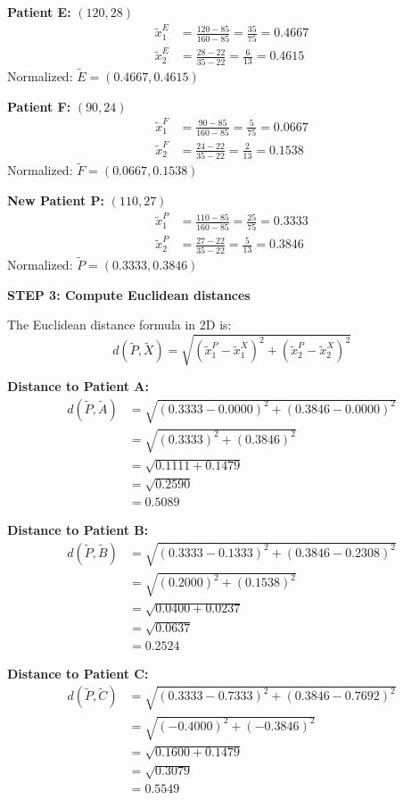 \documentclass[12pt]{article}
\begin{document}
\begin{solution}
\textbf{Patient E:} \((120, 28)\)
\begin{align*}
\tilde{x}_1^E &= \frac{120 - 85}{160 - 85} = \frac{35}{75} = 0.4667 \\
\tilde{x}_2^E &= \frac{28 - 22}{35 - 22} = \frac{6}{13} = 0.4615
\end{align*}
Normalized: \(\tilde{E} = (0.4667, 0.4615)\)

\textbf{Patient F:} \((90, 24)\)
\begin{align*}
\tilde{x}_1^F &= \frac{90 - 85}{160 - 85} = \frac{5}{75} = 0.0667 \\
\tilde{x}_2^F &= \frac{24 - 22}{35 - 22} = \frac{2}{13} = 0.1538
\end{align*}
Normalized: \(\tilde{F} = (0.0667, 0.1538)\)

\textbf{New Patient P:} \((110, 27)\)
\begin{align*}
\tilde{x}_1^P &= \frac{110 - 85}{160 - 85} = \frac{25}{75} = 0.3333 \\
\tilde{x}_2^P &= \frac{27 - 22}{35 - 22} = \frac{5}{13} = 0.3846
\end{align*}
Normalized: \(\tilde{P} = (0.3333, 0.3846)\)

\textbf{STEP 3: Compute Euclidean distances}

The Euclidean distance formula in 2D is:
\[
d(\tilde{P}, \tilde{X}) = \sqrt{(\tilde{x}_1^P - \tilde{x}_1^X)^2 + (\tilde{x}_2^P - \tilde{x}_2^X)^2}
\]

\textbf{Distance to Patient A:}
\begin{align*}
d(\tilde{P}, \tilde{A}) &= \sqrt{(0.3333 - 0.0000)^2 + (0.3846 - 0.0000)^2} \\
&= \sqrt{(0.3333)^2 + (0.3846)^2} \\
&= \sqrt{0.1111 + 0.1479} \\
&= \sqrt{0.2590} \\
&= \boxed{0.5089}
\end{align*}

\textbf{Distance to Patient B:}
\begin{align*}
d(\tilde{P}, \tilde{B}) &= \sqrt{(0.3333 - 0.1333)^2 + (0.3846 - 0.2308)^2} \\
&= \sqrt{(0.2000)^2 + (0.1538)^2} \\
&= \sqrt{0.0400 + 0.0237} \\
&= \sqrt{0.0637} \\
&= \boxed{0.2524}
\end{align*}

\textbf{Distance to Patient C:}
\begin{align*}
d(\tilde{P}, \tilde{C}) &= \sqrt{(0.3333 - 0.7333)^2 + (0.3846 - 0.7692)^2} \\
&= \sqrt{(-0.4000)^2 + (-0.3846)^2} \\
&= \sqrt{0.1600 + 0.1479} \\
&= \sqrt{0.3079} \\
&= \boxed{0.5549}
\end{align*}


\end{solution}
\end{document}
